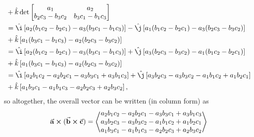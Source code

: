 \documentclass{report}
\newenvironment{answer}
  {\begin{minipage}{\linewidth}}
  {\end{minipage}}
\begin{document}
\begin{answer}
\begin{align*}
&+ \hat{ k} \det \begin{bmatrix} a_1 & a_2 \\ b_2 c_3 - b_3 c_2 & b_3 c_1 - b_1 c_3 \end{bmatrix} \\
%
&= \hat{\i} \left[ a_2 (b_1 c_2 - b_2 c_1) - a_3 (b_3 c_1 - b_1 c_3) \right]
 - \hat{\j} \left[ a_1 (b_1 c_2 - b_2 c_1) - a_3 (b_2 c_3 - b_3 c_2) \right] \\ 
&+ \hat{ k} \left[ a_1 (b_3 c_1 - b_1 c_3) - a_2 (b_2 c_3 - b_3 c_2) \right] \\
%
&= \hat{\i} \left[ a_2 (b_1 c_2 - b_2 c_1) - a_3 (b_3 c_1 - b_1 c_3) \right]
 + \hat{\j} \left[ a_3 (b_2 c_3 - b_3 c_2) - a_1 (b_1 c_2 - b_2 c_1) \right] \\ 
&+ \hat{ k} \left[ a_1 (b_3 c_1 - b_1 c_3) - a_2 (b_2 c_3 - b_3 c_2) \right] \\
%
&= \hat{\i} \left[ a_2 b_1 c_2 - a_2 b_2 c_1 - a_3 b_3 c_1 + a_3 b_1 c_3 \right]
 + \hat{\j} \left[ a_3 b_2 c_3 - a_3 b_3 c_2 - a_1 b_1 c_2 + a_1 b_2 c_1 \right] \\ 
&+ \hat{ k} \left[ a_1 b_3 c_1 - a_1 b_1 c_3 - a_2 b_2 c_3 + a_2 b_3 c_2 \right],
\end{align*}
so altogether, the overall vector can be written (in column form) as
\begin{equation*}
\va{a} \cross (\va{b} \cross \va{c}) =
\left\langle
\begin{matrix}
a_2 b_1 c_2 - a_2 b_2 c_1 - a_3 b_3 c_1 + a_3 b_1 c_3 \\
a_3 b_2 c_3 - a_3 b_3 c_2 - a_1 b_1 c_2 + a_1 b_2 c_1 \\
a_1 b_3 c_1 - a_1 b_1 c_3 - a_2 b_2 c_3 + a_2 b_3 c_2
\end{matrix}
\right\rangle
\end{equation*}
\end{answer}
\end{document}
